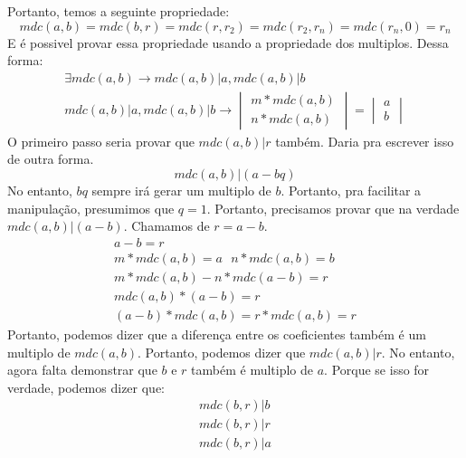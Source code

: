 \documentclass{article}
\begin{document}
    Portanto, temos a seguinte propriedade:
    \begin{equation}
        mdc(a,b) = mdc(b,r) = mdc(r, r_2) = mdc(r_2, r_n) = mdc(r_n, 0) = r_n
    \end{equation}
    E é possivel provar essa propriedade usando a propriedade dos multiplos. Dessa forma:
    \begin{equation}
        \begin{split}
            \exists mdc(a,b) \to mdc(a,b) | a, mdc(a,b) | b\\
            mdc(a,b) | a, mdc(a,b) | b \to \begin{vmatrix}
                m*mdc(a,b)\\
                n*mdc(a,b)
            \end{vmatrix} = \begin{vmatrix}
                a\\
                b
            \end{vmatrix}
        \end{split}
    \end{equation}
    O primeiro passo seria provar que $mdc(a,b) | r$ também. Daria pra escrever isso de outra forma. 
    \begin{equation}
        mdc(a,b) | (a-bq)
    \end{equation}
    No entanto, $bq$ sempre irá gerar um multiplo de $b$. Portanto, pra facilitar a manipulação, presumimos que $q = 1$. Portanto, precisamos provar que na verdade $mdc(a,b) | (a-b)$. Chamamos de $r = a-b$.
    \begin{equation}
        \begin{split}
            a-b = r\\
            m*mdc(a,b) = a\ \ \ n*mdc(a,b) = b\\
            m*mdc(a,b) - n*mdc(a-b) = r\\
            mdc(a,b)*(a-b) = r\\
            (a-b) * mdc(a,b) = r*mdc(a,b) = r
        \end{split}
    \end{equation}
    Portanto, podemos dizer que a diferença entre os coeficientes também é um multiplo de $mdc(a,b)$. Portanto, podemos dizer que $mdc(a,b) | r$. No entanto, agora falta demonstrar que $b$ e $r$ também é multiplo de $a$. Porque se isso for verdade, podemos dizer que:
    \begin{equation}
        \begin{split}
            mdc(b,r) | b\\
            mdc(b,r) | r\\
            mdc(b,r) | a
        \end{split}
    \end{equation}
\end{document}
